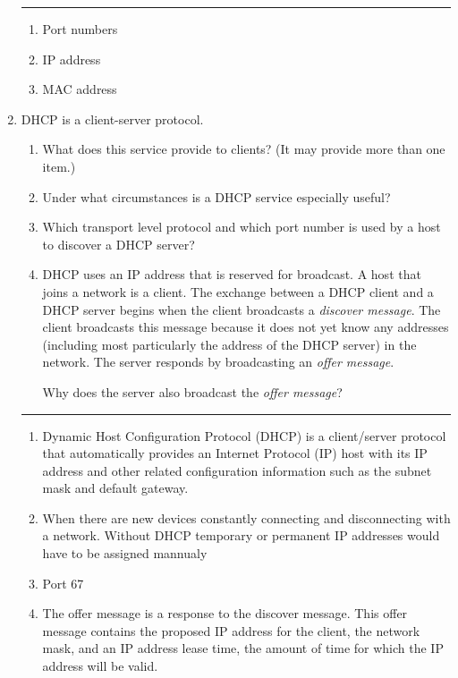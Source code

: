 \documentclass[twoside]{article}
\newenvironment{answer}
  {\vspace*{0.2cm} \rule{12cm}{0.04cm} \vspace*{0.2cm}}
  {\vspace*{0.2cm}}
\begin{document}
\begin{enumerate}
  \begin{answer}

  \begin{enumerate}
    \item Port numbers
    \item IP address
    \item MAC address
    \end{enumerate}

    \end{answer}

  \item DHCP is a client-server protocol.
  \begin{enumerate}
    \item What does this service provide to clients? (It may provide more than one item.) 
    \item Under what circumstances is a DHCP service especially useful?
    \item Which transport level protocol and which port number is used by
      a host to discover a DHCP server?
    \item DHCP uses an IP address that is reserved for broadcast. 
      A host that joins a network is a client.
      The exchange between a DHCP client and a DHCP server begins when
      the client broadcasts a \emph{discover message}.
      The client broadcasts this message because it does not yet know
      any addresses (including most particularly the address of the DHCP
      server) in the network.
      The server responds by broadcasting an \emph{offer message}.

      Why does the server also broadcast the \emph{offer message}?

    \end{enumerate}

  \begin{answer}

  \begin{enumerate}
    \item Dynamic Host Configuration Protocol (DHCP) is a client/server protocol that automatically provides an Internet Protocol (IP) host with its IP address and other related configuration information such as the subnet mask and default gateway.
    \item When there are new devices constantly connecting and disconnecting with a network. Without DHCP temporary or permanent IP addresses would have to be assigned mannualy
    \item Port 67
    \item The offer message is a response to the discover message. This offer message contains the proposed IP address for the client, the network mask, and an IP address lease time, the amount of time for which the IP address will be valid.
    \end{enumerate}


\end{answer}
\end{enumerate}
\end{document}
